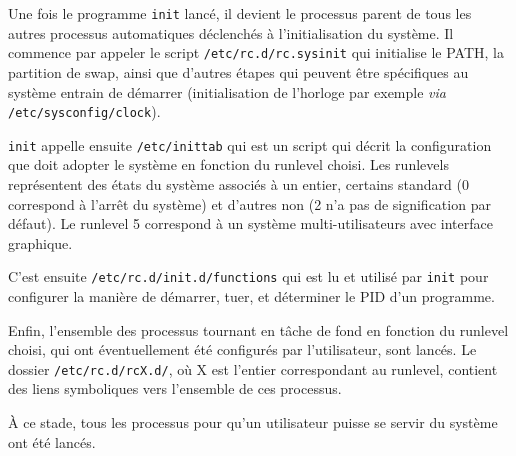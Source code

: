 Une fois le programme \verb|init| lancé, il devient le processus parent de tous les autres processus automatiques déclenchés à l'initialisation du système. Il commence par appeler le script \verb|/etc/rc.d/rc.sysinit| qui initialise le PATH, la partition de swap, ainsi que d'autres étapes qui peuvent être spécifiques au système entrain de démarrer (initialisation de l'horloge par exemple \textit{via} \verb|/etc/sysconfig/clock|).

\verb|init| appelle ensuite \verb|/etc/inittab| qui est un script qui décrit la configuration que doit adopter le système en fonction du runlevel choisi. Les runlevels représentent des états du système associés à un entier, certains standard (0 correspond à l'arrêt du système) et d'autres non (2 n'a  pas de signification par défaut). Le runlevel 5 correspond à un système multi-utilisateurs avec interface graphique.

C'est ensuite \verb|/etc/rc.d/init.d/functions| qui est lu et utilisé par \verb|init| pour configurer la manière de démarrer, tuer, et déterminer le PID d'un programme. 

Enfin, l'ensemble des processus tournant en tâche de fond en fonction du runlevel choisi, qui ont éventuellement été configurés par l'utilisateur, sont lancés. Le dossier \verb|/etc/rc.d/rcX.d/|, où X est l'entier correspondant au runlevel, contient des liens symboliques vers l'ensemble de ces processus. 

À ce stade, tous les processus pour qu'un utilisateur puisse se servir du système ont été lancés.